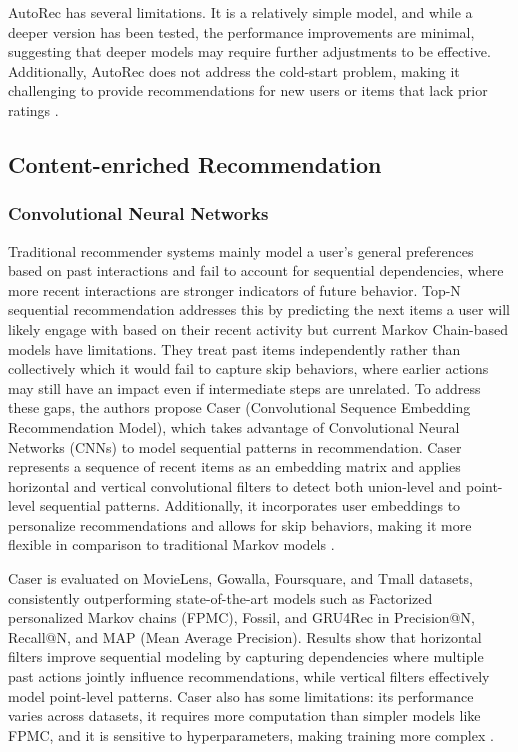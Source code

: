 \documentclass{ieeetj}
\begin{document}
AutoRec has several limitations. It is a relatively simple model, and while a deeper version has been tested, the performance improvements are minimal, suggesting that deeper models may require further adjustments to be effective. Additionally, AutoRec does not address the cold-start problem, making it challenging to provide recommendations for new users or items that lack prior ratings \cite{sedhain2015autorec}. 

\subsection{Content-enriched Recommendation}
\subsubsection{Convolutional Neural Networks}
Traditional recommender systems mainly model a user's general preferences based on past interactions and fail to account for sequential dependencies, where more recent interactions are stronger indicators of future behavior. Top-N sequential recommendation addresses this by predicting the next items a user will likely engage with based on their recent activity but current Markov Chain-based models have limitations. They treat past items independently rather than collectively which it would fail to capture skip behaviors, where earlier actions may still have an impact even if intermediate steps are unrelated. To address these gaps, the authors \cite{tang2018personalized} propose Caser (Convolutional Sequence Embedding Recommendation Model), which takes advantage of Convolutional Neural Networks (CNNs) to model sequential patterns in recommendation. Caser represents a sequence of recent items as an embedding matrix and applies horizontal and vertical convolutional filters to detect both union-level and point-level sequential patterns. Additionally, it incorporates user embeddings to personalize recommendations and allows for skip behaviors, making it more flexible in comparison to traditional Markov models \cite{tang2018personalized}.

Caser is evaluated on MovieLens, Gowalla, Foursquare, and Tmall datasets, consistently outperforming state-of-the-art models such as Factorized personalized Markov
chains (FPMC), Fossil, and GRU4Rec in Precision@N, Recall@N, and MAP (Mean Average Precision). Results show that horizontal filters improve sequential modeling by capturing dependencies where multiple past actions jointly influence recommendations, while vertical filters effectively model point-level patterns. Caser also has some limitations: its performance varies across datasets, it requires more computation than simpler models like FPMC, and it is sensitive to hyperparameters, making training more complex \cite{tang2018personalized}.
\end{document}
